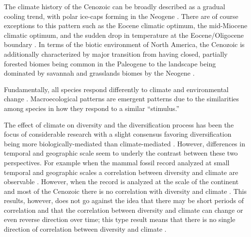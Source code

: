 \documentclass[12pt,letterpaper]{article}
\begin{document}



The climate history of the Cenozoic can be broadly described as a gradual cooling trend, with polar ice-caps forming in the Neogene \citep{Zachos2001,Zachos2008,Cramer2011}. There are of course exceptions to this pattern such as the Eocene climatic optimum, the mid-Miocene climatic optimum, and the sudden drop in temperature at the Eocene/Oligocene boundary \citep{Zachos2001,Zachos2008}. In terms of the biotic environment of North America, the Cenozoic is additionally characterized by major transition from having closed, partially forested biomes being common in the Paleogene to the landscape being dominated by savannah and grasslands biomes by the Neogene \citep{Blois2009,Janis1993b,Janis2000,Stromberg2005}.





Fundamentally, all species respond differently to climate and environmental change \citep{Blois2009}. Macroecological patterns are emergent patterns due to the similarities among species in how they respond to a similar ``stimulus.''

The effect of climate on diversity and the diversification process has been the focus of considerable research with a slight consensus favoring diversification being more biologically-mediated than climate-mediated \citep{Alroy1996a,Alroy2000g,Figueirido2012,Clyde1998a}. However, differences in temporal and geographic scale seem to underly the contrast between these two perspectives. For example when the mammal fossil record analyzed at small temporal and geographic scales a correlation between diversity and climate are observable \citep{Clyde1998a}. However, when the record is analyzed at the scale of the continent and most of the Cenozoic there is no correlation with diversity and climate \citep{Alroy2000g}. This results, however, does not go against the idea that there may be short periods of correlation and that the correlation between diversity and climate can change or even reverse direction over time; this type result means that there is no single direction of correlation between diversity and climate \citep{Figueirido2012}. 
\end{document}
